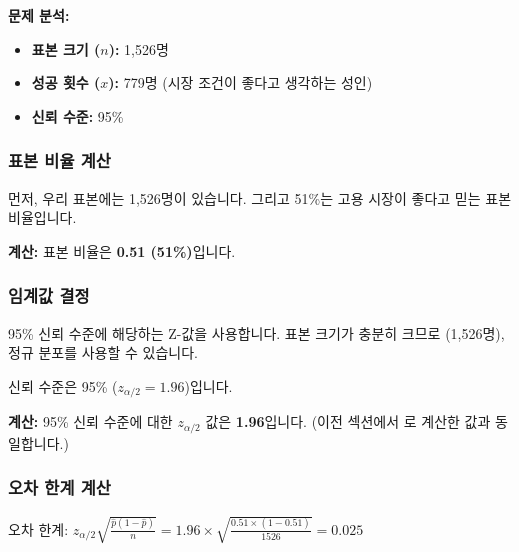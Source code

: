 \documentclass[11pt,a4paper]{article}
\theoremstyle{definition}
\begin{document}
\textbf{문제 분석:}
\begin{itemize}
    \item \textbf{표본 크기 ($n$):} 1,526명
    \item \textbf{성공 횟수 ($x$):} 779명 (시장 조건이 좋다고 생각하는 성인)
    \item \textbf{신뢰 수준:} 95\%
\end{itemize}

\subsubsection{표본 비율 계산}

\begin{tcolorbox}[title=슬라이드 71: 지역 고용 시장 조건이 좋은가? (2/2)]
먼저, 우리 표본에는 1,526명이 있습니다. 그리고 51\%는 고용 시장이 좋다고 믿는 표본 비율입니다.
\end{tcolorbox}

\textbf{계산:}
표본 비율은 \textbf{0.51 (51\%)}입니다.

\subsubsection{임계값 결정}

95\% 신뢰 수준에 해당하는 Z-값을 사용합니다. 표본 크기가 충분히 크므로 (1,526명), 정규 분포를 사용할 수 있습니다.

\begin{tcolorbox}[title=슬라이드 71: 지역 고용 시장 조건이 좋은가? (2/2)]
신뢰 수준은 95\% ($z_{\alpha/2} = 1.96$)입니다.
\end{tcolorbox}

\textbf{계산:}
95\% 신뢰 수준에 대한 $z_{\alpha/2}$ 값은 \textbf{1.96}입니다. (이전 섹션에서 로 계산한 값과 동일합니다.)

\subsubsection{오차 한계 계산}

\begin{tcolorbox}[title=슬라이드 71: 지역 고용 시장 조건이 좋은가? (2/2)]
오차 한계: $z_{\alpha/2} \sqrt{\frac{\hat{p}(1-\hat{p})}{n}} = 1.96 \times \sqrt{\frac{0.51 \times (1-0.51)}{1526}} = 0.025$
\end{tcolorbox}
\end{document}
